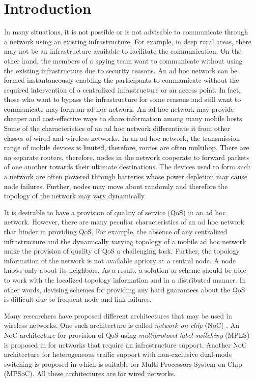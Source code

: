 \documentclass[10pt,times,epsfig,psfig,twocolumn,algorithm,algorithmic]{IEEEtran}
\begin{document}
\section{Introduction}
In many situations, it is not possible or is not advisable 
to communicate through a network using an existing infrastructure. For example,  in deep rural areas, there may not be an infrastructure available to facilitate the communication. On the other hand, the members of a spying team want to communicate without using the existing infrastructure due to security reasons. An ad hoc network can be formed instantaneously enabling the participants to communicate without the required intervention of a centralized infrastructure or an access point. In fact, those who want to bypass the infrastructure for some reasons and still want to communicate may form an ad hoc network. An ad hoc network may provide cheaper and cost-effective ways to share information among many mobile hosts. Some of the characteristics of an ad hoc network differentiate it from other classes of wired and wireless networks. In an ad hoc network, the transmission range of mobile devices is limited, therefore, routes are often multihop. There are no separate routers, therefore, nodes in the network cooperate to forward packets of one another towards their ultimate destinations. The devices used to form such a network are often powered through batteries whose power depletion may cause node failures. Further, nodes may move about randomly and therefore the topology of the network may vary dynamically. 

It is desirable to have a provision of quality of service (QoS) in an ad hoc network. However, there are many peculiar characteristics of an ad hoc network that hinder in providing QoS. For example, the absence of any centralized infrastructure and the dynamically varying topology of a mobile ad hoc network make the provision of quality of QoS a challenging task. Further, the topology information of the network is not available apriory at a central node. A node knows only about its neighbors. As a result, a solution or scheme should be able to work with the localized topology information and in a distributed manner. In other words, devising schemes for providing any hard guarantees about the QoS is difficult due to frequent node and link failures. 

 Many researchers have proposed different architectures that may be used in wireless networks. One such architecture is called {\em network on chip} (NoC) \cite{cidon}. An NoC architecture for provision of QoS using {\em multiprotocol label switching} (MPLS) is proposed in \cite{kim} for networks that require an infrastructure support. Another NoC architecture for heterogeneous traffic support with non-exclusive dual-mode switching is proposed in \cite{secchi} which is suitable for Multi-Processors System on Chip (MPSoC). All these architectures are for wired networks.  
\end{document}
